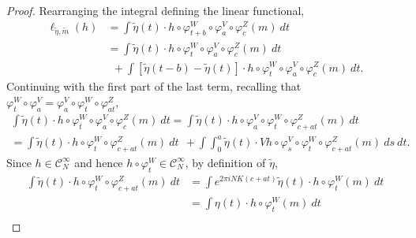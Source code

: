 \documentclass[a4paper,11pt]{amsart}
\theoremstyle{remark}
\newcommand{\cC}{\mathcal{C}} %
\newcommand{\dv}{V} %
\newcommand{\dw}{W} %
\newcommand{\dz}{Z} %
\begin{document}
\begin{proof}
    Rearranging the integral defining the linear functional,
    \begin{equation}
        \label{eq:slide1}
        \begin{aligned}
            \ell_{\tilde{\eta},\tilde{m}}(h)
             & = \int \tilde{\eta}(t) \cdot h \circ \varphi_{t+b}^{\dw} \circ \varphi_a^\dv \circ \varphi_c^\dz (m) \ dt                                     \\
             & = \int \tilde{\eta}(t) \cdot h \circ \varphi_{t}^{\dw} \circ \varphi_a^\dv \circ \varphi_c^\dz (m) \ dt                                       \\
             & \ \ + \int \left[\tilde{\eta}(t-b) - \tilde{\eta}(t)\right] \cdot h \circ \varphi_{t}^{\dw} \circ \varphi_a^\dv \circ \varphi_c^\dz (m) \ dt.
        \end{aligned}
    \end{equation}
    Continuing with the first part of the last term, recalling that \(\varphi_{t}^{\dw} \circ \varphi_a^\dv = \varphi_a^\dv  \circ \varphi_{t}^{\dw} \circ \varphi_{at}^\dz\),
    \begin{multline}
        \label{eq:slide2}
            \int \tilde{\eta}(t) \cdot h \circ \varphi_{t}^{\dw} \circ \varphi_a^\dv \circ \varphi_c^\dz (m) \ dt
              = \int \tilde{\eta}(t) \cdot h \circ \varphi_a^\dv  \circ \varphi_{t}^{\dw} \circ \varphi_{c+at}^\dz (m) \ dt                               \\
             = \int \tilde{\eta}(t) \cdot h \circ \varphi_{t}^{\dw} \circ \varphi_{c+at}^\dz (m) \ dt                                                    
              \ \ + \int \int_{0}^{a} \tilde{\eta}(t) \cdot \dv h \circ \varphi_{s}^{\dv} \circ \varphi_{t}^{\dw} \circ \varphi_{c+at}^\dz (m) \ ds \ dt.
    \end{multline}
    Since \(h \in \cC^{\infty}_{N}\) and hence \(h \circ \varphi_{t}^{\dw}  \in \cC^{\infty}_{N}\), by definition of \(\tilde{\eta}\),
    \begin{equation}
        \label{eq:slide3}
        \begin{aligned}
            \int \tilde{\eta}(t) \cdot h \circ \varphi_{t}^{\dw} \circ \varphi_{c+at}^\dz (m) \ dt
             & = \int e^{2\pi i NK (c + at)} \tilde{\eta}(t) \cdot h \circ \varphi_{t}^{\dw} (m) \ dt \\
             & = \int \eta(t) \cdot h \circ \varphi_{t}^{\dw} (m) \ dt                               \\

\end{aligned}
\end{equation}
\end{proof}
\end{document}
